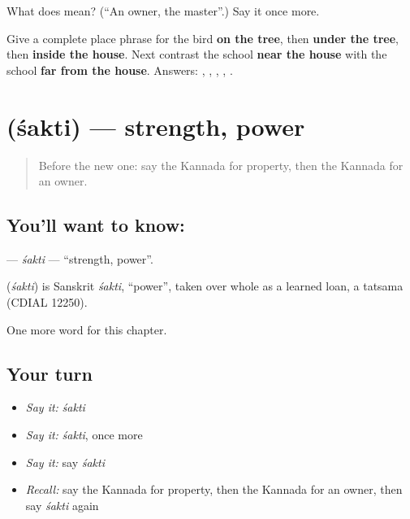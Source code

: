 \begin{tcolorbox}[breakable,colback=teal!4,colframe=teal!35!black,title={Before you move on}]
What does  mean? (\textquotedblleft{}An owner, the master\textquotedblright{}.) Say it once more.
\end{tcolorbox}

\begin{tcolorbox}[breakable,colback=teal!4,colframe=teal!35!black,title={Before you move on}]
Give a complete place phrase for the bird \textbf{on the tree}, then \textbf{under the tree}, then \textbf{inside the house}. Next contrast the school \textbf{near the house} with the school \textbf{far from the house}. Answers: \textbf{ }, \textbf{ }, \textbf{}, \textbf{ }, \textbf{ }.
\end{tcolorbox}
\section[\texorpdfstring{\kn{ಶಕ್ತಿ} (śakti)}{ಶಕ್ತಿ (śakti)}]{ (śakti) — strength, power}

\label{lesson:KA-C113-sakti}



\begin{quote}
Before the new one: say the Kannada for property, then the Kannada for an owner.
\end{quote}

\subsection*{You'll want to know: }
\textbf{} — \emph{śakti} — \textquotedblleft{}strength, power\textquotedblright{}.

\begin{cousinweb}
\textbf{} (\emph{śakti}) is Sanskrit \emph{śakti}, \textquotedblleft{}power\textquotedblright{}, taken over whole as a learned loan, a tatsama (CDIAL 12250).
\end{cousinweb}

\begin{grammarlens}[title={What you've built}]
One more word for this chapter.
\end{grammarlens}

\subsection*{Your turn}
\begin{itemize}
\raggedright
  \item \emph{Say it:} \emph{śakti}
  \item \emph{Say it:} \emph{śakti}, once more
  \item \emph{Say it:} say \emph{śakti}
  \item \emph{Recall:} say the Kannada for property, then the Kannada for an owner, then say \emph{śakti} again
\end{itemize}


